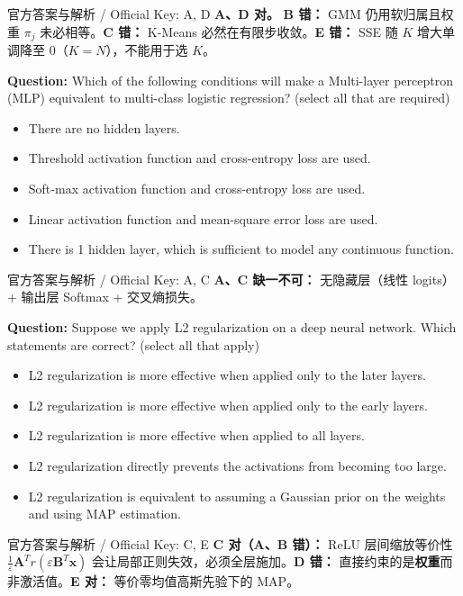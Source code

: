 \begin{StudySolution}{官方答案与解析 / Official Key: A, D}
\textbf{A、D 对。} \textbf{B 错：} GMM 仍用软归属且权重 $\pi_j$ 未必相等。\textbf{C 错：} K-Means 必然在有限步收敛。\textbf{E 错：} SSE 随 $K$ 增大单调降至 0（$K=N$），不能用于选 $K$。
\end{StudySolution}

\textbf{Question:} Which of the following conditions will make a Multi-layer perceptron (MLP) equivalent to multi-class logistic regression? (select all that are required)
\begin{itemize}
\item[A)] There are no hidden layers.
\item[B)] Threshold activation function and cross-entropy loss are used.
\item[C)] Soft-max activation function and cross-entropy loss are used.
\item[D)] Linear activation function and mean-square error loss are used.
\item[E)] There is 1 hidden layer, which is sufficient to model any continuous function.
\end{itemize}

\begin{StudySolution}{官方答案与解析 / Official Key: A, C}
\textbf{A、C 缺一不可：} 无隐藏层（线性 logits）+ 输出层 Softmax + 交叉熵损失。
\end{StudySolution}

\textbf{Question:} Suppose we apply L2 regularization on a deep neural network. Which statements are correct? (select all that apply)
\begin{itemize}
\item[A)] L2 regularization is more effective when applied only to the later layers.
\item[B)] L2 regularization is more effective when applied only to the early layers.
\item[C)] L2 regularization is more effective when applied to all layers.
\item[D)] L2 regularization directly prevents the activations from becoming too large.
\item[E)] L2 regularization is equivalent to assuming a Gaussian prior on the weights and using MAP estimation.
\end{itemize}

\begin{StudySolution}{官方答案与解析 / Official Key: C, E}
\textbf{C 对（A、B 错）：} ReLU 层间缩放等价性 $\frac{1}{\varepsilon}\mathbf{A}^T r(\varepsilon\mathbf{B}^T\mathbf{x})$ 会让局部正则失效，必须全层施加。\textbf{D 错：} 直接约束的是\textbf{权重}而非激活值。\textbf{E 对：} 等价零均值高斯先验下的 MAP。
\end{StudySolution}

